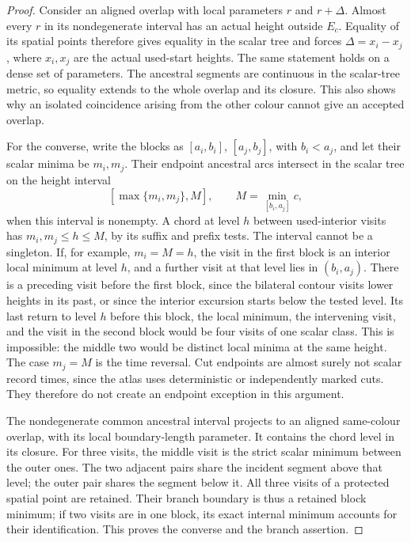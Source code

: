 \begin{proof}
Consider an aligned overlap with local parameters \(r\) and
\(r+\Delta\).  Almost every \(r\) in its nondegenerate interval
has an actual height outside \(E_c\).  Equality of its spatial points
therefore gives equality in the scalar tree and forces
\(\Delta=x_i-x_j\), where \(x_i,x_j\) are the actual used-start
heights.  The same statement holds on a dense set of parameters.
The ancestral segments are continuous in the scalar-tree metric,
so equality extends to the whole overlap and its closure.  This
also shows why an isolated coincidence arising from the other
colour cannot give an accepted overlap.

For the converse, write the blocks as \([a_i,b_i]\),
\([a_j,b_j]\), with \(b_i<a_j\), and let their scalar minima be
\(m_i,m_j\).  Their endpoint ancestral arcs intersect in the scalar
tree on the height interval
\[
 [\max\{m_i,m_j\},M],\qquad
 M=\min_{[b_i,a_j]}c,
\]
when this interval is nonempty.  A chord at level \(h\) between
used-interior visits has \(m_i,m_j\le h\le M\), by its suffix and
prefix tests.  The interval cannot be a singleton.  If, for example,
\(m_i=M=h\), the visit in the first block is an interior local
minimum at level \(h\), and a further visit at that level lies in
\((b_i,a_j)\).  There is a preceding visit before the first block, since the
bilateral contour visits lower heights in its past, or since the
interior excursion starts below the tested level.  Its last return
to level \(h\) before this block, the local minimum, the intervening
visit, and the visit in the second block would be four visits of one
scalar class.  This is impossible:
the middle two would be distinct local minima at the same height.
The case \(m_j=M\) is the time reversal.  Cut endpoints are almost
surely not scalar record times, since the atlas uses deterministic
or independently marked cuts.  They therefore do not create an
endpoint exception in this argument.

The nondegenerate common ancestral interval projects to an aligned
same-colour overlap, with its local boundary-length parameter.
It contains the chord level in its closure.  For three visits,
the middle visit is the strict scalar minimum between the outer
ones.  The two adjacent pairs share the incident segment above
that level; the outer pair shares the segment below it.  All
three visits of a protected spatial point are retained.  Their
branch boundary is thus a retained block minimum; if two visits
are in one block, its exact internal minimum accounts for their
identification.  This proves the converse and the branch assertion.
\end{proof}

